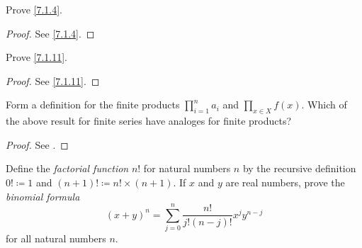 \exercisesection

\begin{ex}\label{ex:7.1.1}
  Prove \cref{7.1.4}.
\end{ex}

\begin{proof}
  See \cref{7.1.4}.
\end{proof}

\begin{ex}\label{ex:7.1.2}
  Prove \cref{7.1.11}.
\end{ex}

\begin{proof}
  See \cref{7.1.11}.
\end{proof}

\begin{ex}\label{ex:7.1.3}
  Form a definition for the finite products \(\prod_{i = 1}^n a_i\) and \(\prod_{x \in X} f(x)\).
  Which of the above result for finite series have analoges for finite products?
\end{ex}

\begin{proof}
  See .
\end{proof}

\begin{ex}\label{ex:7.1.4}
  Define the \emph{factorial function} \(n!\) for natural numbers \(n\) by the recursive definition \(0! \coloneqq 1\) and \((n + 1)! \coloneqq n! \times (n + 1)\).
  If \(x\) and \(y\) are real numbers, prove the \emph{binomial formula}
  \[
    (x + y)^n = \sum_{j = 0}^n \dfrac{n!}{j!(n - j)!} x^j y^{n - j}
  \]
  for all natural numbers \(n\).
\end{ex}

